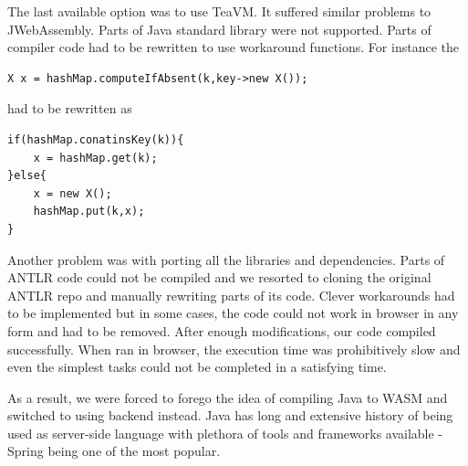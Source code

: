 The last available option was to use TeaVM. It suffered similar problems to JWebAssembly. Parts of Java standard library were not supported. Parts of compiler code had to be rewritten to use workaround functions. For instance
the
\begin{lstlisting}
X x = hashMap.computeIfAbsent(k,key->new X());
\end{lstlisting}
had to be rewritten as
\begin{lstlisting}
if(hashMap.conatinsKey(k)){
    x = hashMap.get(k);
}else{
    x = new X();
    hashMap.put(k,x);
}
\end{lstlisting}
Another problem was with porting all the libraries and dependencies.
Parts of ANTLR code could not be compiled and we resorted to cloning the original ANTLR repo and manually rewriting parts of its code. Clever workarounds had to be implemented but in some cases, the code could not work in browser in any form and had to be removed.
After enough modifications, our code compiled successfully.
When ran in browser, the execution time was prohibitively slow and even the simplest tasks could not be completed in a satisfying time.

As a result, we were forced to forego the idea of compiling Java to WASM and switched to using backend instead. Java has long and extensive history of being used as server-side language with plethora of tools and frameworks available - Spring being one of the most popular.